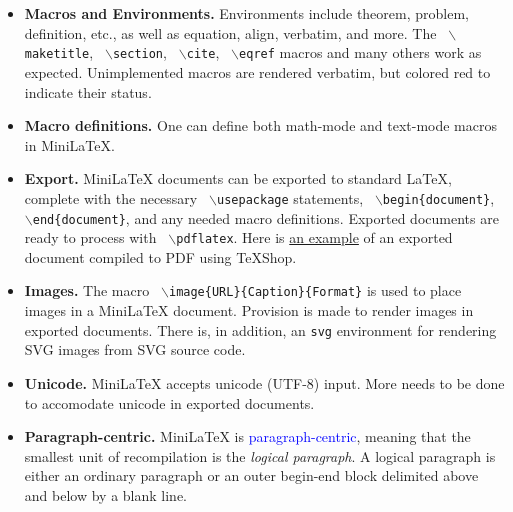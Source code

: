 \documentclass[11pt, oneside]{article}
\newcommand{\code}[1]{{\tt #1}}
\newcommand{\italic}[1]{{\sl #1}}
\newcommand{\strong}[1]{{\bf #1}}
\newcommand{\blue}[1]{\textcolor{blue}{#1}}
\newcommand{\bs}[1]{$\backslash$#1}
\newcommand{\texarg}[1]{\{#1\}}
\begin{document}
\begin{itemize}
\item  \strong{Macros  and  Environments.} Environments  include  theorem,  problem,  definition,  etc.,  as  well  as  equation,  align,  verbatim,  and  more.   The   \code{ \bs{maketitle}},   \code{ \bs{section}},  \code{ \bs{cite}},   \code{ \bs{eqref}} macros  and  many  others  work  as  expected.   Unimplemented  macros  are  rendered  verbatim,  but  colored  red  to  indicate  their  status.



 \item  \strong{Macro  definitions.} One  can  define  both  math-mode  and  text-mode  macros  in  MiniLaTeX.



 \item  \strong{Export.} MiniLaTeX  documents  can  be  exported  to  standard  LaTeX,  complete  with  the  necessary   \code{ \bs{usepackage}} statements,   \code{ \bs{begin}\texarg{document}},   \code{ \bs{end}\texarg{document}},  and  any  needed  macro  definitions.   Exported  documents  are  ready  to  process  with   \code{ \bs{pdflatex}}.   Here  is   \href{https://noteimages.s3.amazonaws.com/anharmonic_oscillator.pdf}{an  example} of  an  exported  document  compiled  to  PDF  using  TeXShop.




 \item  \strong{Images.} The  macro   \code{ \bs{image}\texarg{URL}\texarg{Caption}\texarg{Format}} is  used  to  place  images  in  a  MiniLaTeX  document.
 Provision  is  made  to  render  images  in  exported  documents.   There  is,  in  addition,  an   \code{svg} environment  for  rendering  SVG  images  from  SVG  source  code.



 \item  \strong{Unicode.} MiniLaTeX  accepts  unicode  (UTF-8)  input.  More  needs  to  be  done  to  accomodate  unicode  in  exported  documents.



 \item  \strong{Paragraph-centric.} MiniLaTeX  is   \blue{paragraph-centric},  meaning  that  the  smallest  unit  of  recompilation  is  the   \italic{logical  paragraph}.   A  logical  paragraph  is  either  an  ordinary  paragraph  or  an  outer  begin-end  block delimited above and below by a blank line.




\end{itemize}
\end{document}
